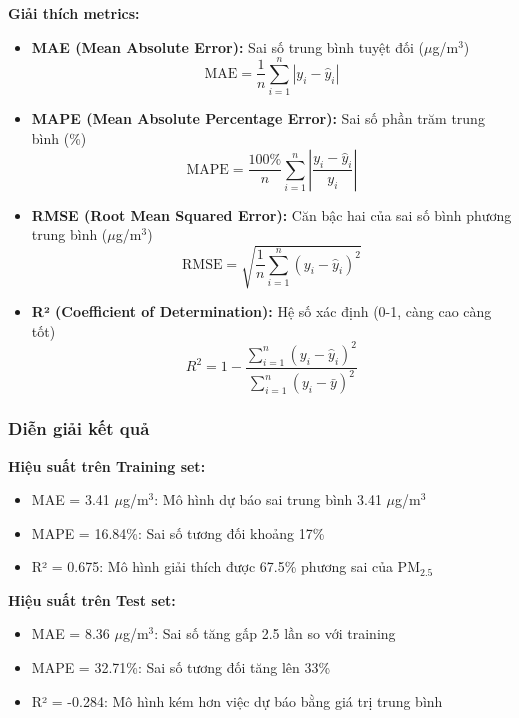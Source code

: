 \documentclass[12pt,a4paper]{article}
\newcommand{\ugm}{$\mu$g/m$^3$}
\newcommand{\pmtwofive}{PM$_{2.5}$}
\begin{document}
\textbf{Giải thích metrics:}
\begin{itemize}
    \item \textbf{MAE (Mean Absolute Error):} Sai số trung bình tuyệt đối (\ugm{})
    \begin{equation}
    \text{MAE} = \frac{1}{n}\sum_{i=1}^{n}|y_i - \hat{y}_i|
    \end{equation}
    
    \item \textbf{MAPE (Mean Absolute Percentage Error):} Sai số phần trăm trung bình (\%)
    \begin{equation}
    \text{MAPE} = \frac{100\%}{n}\sum_{i=1}^{n}\left|\frac{y_i - \hat{y}_i}{y_i}\right|
    \end{equation}
    
    \item \textbf{RMSE (Root Mean Squared Error):} Căn bậc hai của sai số bình phương trung bình (\ugm{})
    \begin{equation}
    \text{RMSE} = \sqrt{\frac{1}{n}\sum_{i=1}^{n}(y_i - \hat{y}_i)^2}
    \end{equation}
    
    \item \textbf{R² (Coefficient of Determination):} Hệ số xác định (0-1, càng cao càng tốt)
    \begin{equation}
    R^2 = 1 - \frac{\sum_{i=1}^{n}(y_i - \hat{y}_i)^2}{\sum_{i=1}^{n}(y_i - \bar{y})^2}
    \end{equation}
\end{itemize}

\subsubsection{Diễn giải kết quả}

\textbf{Hiệu suất trên Training set:}
\begin{itemize}
    \item MAE = 3.41 \ugm{}: Mô hình dự báo sai trung bình 3.41 \ugm{}
    \item MAPE = 16.84\%: Sai số tương đối khoảng 17\%
    \item R² = 0.675: Mô hình giải thích được 67.5\% phương sai của \pmtwofive{}
\end{itemize}

\textbf{Hiệu suất trên Test set:}
\begin{itemize}
    \item MAE = 8.36 \ugm{}: Sai số tăng gấp 2.5 lần so với training
    \item MAPE = 32.71\%: Sai số tương đối tăng lên 33\%
    \item R² = -0.284: Mô hình kém hơn việc dự báo bằng giá trị trung bình
\end{itemize}
\end{document}
